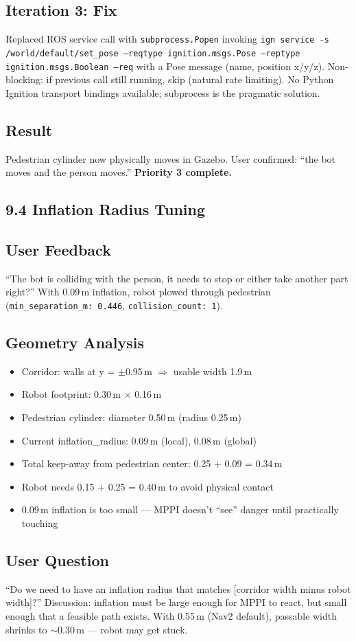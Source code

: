 \documentclass[11pt]{article}
\newcommand{\logentry}[1]{\subsection*{#1}}
\begin{document}
\logentry{Iteration 3: Fix}
Replaced ROS service call with \texttt{subprocess.Popen} invoking \texttt{ign
service -s /world/default/set\_pose --reqtype ignition.msgs.Pose --reptype
ignition.msgs.Boolean --req} with a Pose message (name, position x/y/z).
Non-blocking: if previous call still
running, skip (natural rate limiting). No Python Ignition transport bindings
available; subprocess is the pragmatic solution.

\logentry{Result}
Pedestrian cylinder now physically moves in Gazebo. User confirmed: ``the bot
moves and the person moves.'' \textbf{Priority 3 complete.}


\subsection*{9.4 Inflation Radius Tuning}

\logentry{User Feedback}
``The bot is colliding with the person, it needs to stop or either take another
part right?'' With 0.09\,m inflation, robot plowed through pedestrian
(\texttt{min\_separation\_m: 0.446}, \texttt{collision\_count: 1}).

\logentry{Geometry Analysis}
\begin{itemize}
  \item Corridor: walls at y = $\pm$0.95\,m $\Rightarrow$ usable width 1.9\,m
  \item Robot footprint: 0.30\,m $\times$ 0.16\,m
  \item Pedestrian cylinder: diameter 0.50\,m (radius 0.25\,m)
  \item Current inflation\_radius: 0.09\,m (local), 0.08\,m (global)
  \item Total keep-away from pedestrian center: 0.25 + 0.09 = 0.34\,m
  \item Robot needs 0.15 + 0.25 = 0.40\,m to avoid physical contact
  \item 0.09\,m inflation is too small --- MPPI doesn't ``see'' danger until
    practically touching
\end{itemize}

\logentry{User Question}
``Do we need to have an inflation radius that matches [corridor width minus
robot width]?'' Discussion: inflation must be large enough for MPPI to react,
but small enough that a feasible path exists. With 0.55\,m (Nav2 default),
passable width shrinks to $\sim$0.30\,m --- robot may get stuck.
\end{document}
